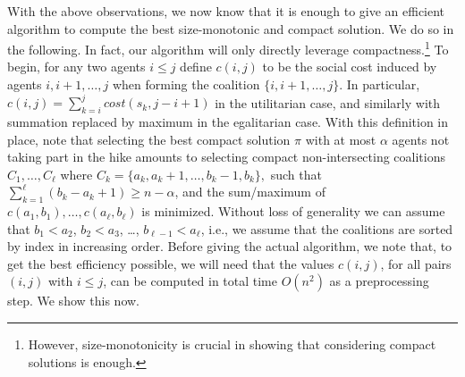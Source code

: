 \documentclass[a4paper]{article}
\newcommand{\cost}{\mathit{cost}}
\begin{document}
\noindent With the above observations, we now know that it is enough to give an efficient algorithm to compute the best size-monotonic and compact solution. We do so in the following. In fact, our algorithm will only directly leverage compactness.\footnote{However, size-monotonicity is crucial in showing that considering compact solutions is enough.} To begin, for any two agents $i \leq j$ define $c(i, j)$ to be the social cost induced by agents $i, i + 1, \ldots, j$ when forming the coalition $\{i, i + 1, \ldots, j\}.$ In particular, $c(i, j) = \sum_{k = i}^{j}\cost(s_k,j - i + 1)$ in the utilitarian case, and similarly with summation replaced by maximum in the egalitarian case. With this definition in place, note that selecting the best compact solution $\pi$ with at most $\alpha$ agents not taking part in the hike amounts to selecting compact non-intersecting coalitions $C_1, \ldots, C_\ell$ 
where $C_k = \{a_k, a_k+1, \ldots, b_k -1, b_k\},$
such that $\sum_{k = 1}^{\ell}(b_k - a_k + 1) \geq n - \alpha$, 
and the sum/maximum of $c(a_1, b_1), \ldots, c(a_\ell, b_\ell)$ is minimized. Without loss of generality we can assume that $b_1 < a_2$, $b_2 < a_3$, \dots, $b_{\ell -1} < a_{\ell}$, i.e., we assume that the coalitions are sorted by index in increasing order. Before giving the actual algorithm, we note that, to get the best efficiency possible, we will need that the values $c(i, j)$, for all pairs $(i, j)$ with $i\leq j$, can be computed in total time $O(n^2)$ as a preprocessing step. We show this now.
\end{document}
